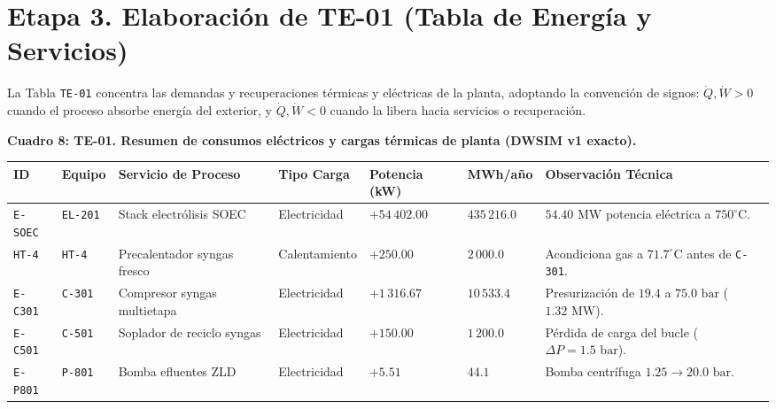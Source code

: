 \documentclass[11pt,letterpaper]{article}
\begin{document}
\clearpage
\section{Etapa 3. Elaboración de TE-01 (Tabla de Energía y Servicios)}

La Tabla \texttt{TE-01} concentra las demandas y recuperaciones térmicas y eléctricas de la planta, adoptando la convención de signos: $\dot{Q}, \dot{W} > 0$ cuando el proceso absorbe energía del exterior, y $\dot{Q}, \dot{W} < 0$ cuando la libera hacia servicios o recuperación.

\begin{center}
\footnotesize
\setlength{\tabcolsep}{3.5pt}
\renewcommand{\arraystretch}{1.04}
\textbf{Cuadro 8: TE-01. Resumen de consumos eléctricos y cargas térmicas de planta (DWSIM v1 exacto).}\\[2pt]
\begin{tabularx}{\textwidth}{>{\raggedright\arraybackslash\ttfamily}p{1.7cm} >{\raggedright\arraybackslash\ttfamily}p{1.5cm} >{\raggedright\arraybackslash}p{3.4cm} >{\raggedright\arraybackslash}p{2.2cm} >{\raggedleft\arraybackslash}p{2.0cm} >{\raggedleft\arraybackslash}p{1.7cm} >{\raggedright\arraybackslash}X}
\toprule
\textbf{ID} & \textbf{Equipo} & \textbf{Servicio de Proceso} & \textbf{Tipo Carga} & \textbf{Potencia (kW)} & \textbf{MWh/año} & \textbf{Observación Técnica} \\
\midrule
\texttt{E-SOEC} & \texttt{EL-201} & Stack electrólisis SOEC & Electricidad & $+54\,402.00$ & $435\,216.0$ & $54.40\text{ MW}$ potencia eléctrica a $750^\circ\text{C}$. \\
\texttt{HT-4} & \texttt{HT-4} & Precalentador syngas fresco & Calentamiento & $+250.00$ & $2\,000.0$ & Acondiciona gas a $71.7^\circ\text{C}$ antes de \texttt{C-301}. \\
\texttt{E-C301} & \texttt{C-301} & Compresor syngas multietapa & Electricidad & $+1\,316.67$ & $10\,533.4$ & Presurización de $19.4$ a $75.0\text{ bar}$ ($1.32\text{ MW}$). \\
\texttt{E-C501} & \texttt{C-501} & Soplador de reciclo syngas & Electricidad & $+150.00$ & $1\,200.0$ & Pérdida de carga del bucle ($\Delta P = 1.5\text{ bar}$). \\
\texttt{E-P801} & \texttt{P-801} & Bomba efluentes ZLD & Electricidad & $+5.51$ & $44.1$ & Bomba centrífuga $1.25 \to 20.0\text{ bar}$. \\

\end{tabularx}
\end{center}
\end{document}
